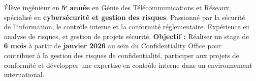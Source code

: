 
\begin{cvparagraph}

  Élève ingénieur en \textbf{5ᵉ année} en Génie des Télécommunications et Réseaux, spécialisé en \textbf{cybersécurité et gestion des risques}. Passionné par la sécurité de l'information, le contrôle interne et la conformité réglementaire. Expérience en analyse de risques, et gestion de projets sécurité.
  \newline
  \newline
  \textbf{Objectif :} Réaliser un stage de \textbf{6 mois} à partir de \textbf{janvier 2026} au sein du Confidentiality Office pour contribuer à la gestion des risques de confidentialité, participer aux projets de conformité et développer une expertise en contrôle interne dans un environnement international.

\end{cvparagraph}
